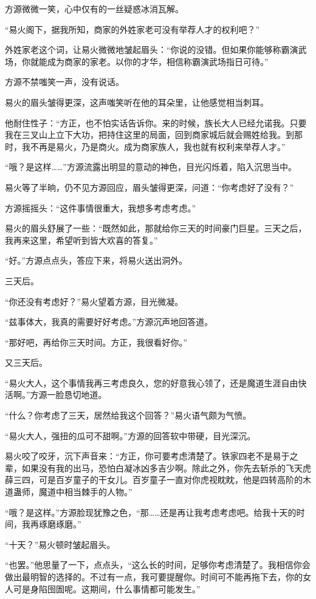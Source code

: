 \begin{this_body}
方源微微一笑，心中仅有的一丝疑惑冰消瓦解。

“易火阁下，据我所知，商家的外姓家老可没有举荐人才的权利吧？”

外姓家老这个词，让易火微微地皱起眉头：“你说的没错。但如果你能够称霸演武场，你就能成为商家的家老。以你的才华，相信称霸演武场指日可待。”

方源不禁嗤笑一声，没有说话。

易火的眉头皱得更深，这声嗤笑听在他的耳朵里，让他感觉相当刺耳。

他耐住性子：“方正，也不怕实话告诉你。来的时候，族长大人已经允诺我。只要我在三叉山上立下大功，把持住这里的局面，回到商家城后就会赐姓给我。到那时，我不再是易火，乃是商火。成为商家族人，我也就有权利来举荐人才。”

“哦？是这样……”方源流露出明显的意动的神色，目光闪烁着，陷入沉思当中。

易火等了半晌，仍不见方源回应，眉头皱得更深，问道：“你考虑好了没有？”

方源摇摇头：“这件事情很重大，我想多考虑考虑。”

易火的眉头舒展了一些：“既然如此，那就给你三天的时间豪门巨星。三天之后，我再来这里，希望听到皆大欢喜的答复。”

“好。”方源点点头，答应下来，将易火送出洞外。

三天后。

“你还没有考虑好？”易火望着方源，目光微凝。

“兹事体大，我真的需要好好考虑。”方源沉声地回答道。

“那好吧，再给你三天时间。方正，我很看好你。”

又三天后。

“易火大人，这个事情我再三考虑良久，您的好意我心领了，还是魔道生涯自由快活啊。”方源一脸恳切地道。

“什么？你考虑了三天，居然给我这个回答？”易火语气颇为气愤。

“易火大人，强扭的瓜可不甜啊。”方源的回答软中带硬，目光深沉。

易火咬了咬牙，沉下声音来：“方正，你可要考虑清楚了。铁家四老不是易于之辈，如果没有我的出马，恐怕白凝冰凶多吉少啊。除此之外，你先去斩杀的飞天虎薛三四，可是百岁童子的干女儿。百岁童子一直对你虎视眈眈，他是四转高阶的木道蛊师，魔道中相当棘手的人物。”

“哦？是这样。”方源脸现犹豫之色，“那……还是再让我考虑考虑吧。给我十天的时间，我再琢磨琢磨。”

“十天？”易火顿时皱起眉头。

“也罢。”他思量了一下，点点头，“这么长的时间，足够你考虑清楚了。我相信你会做出最明智的选择的。不过有一点，我可要提醒你。时间可不能再拖下去，你的女人可是身陷囹圄呢。这期间，什么事情都可能发生。”


\end{this_body}
